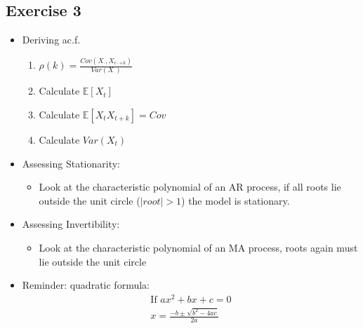\subsection{Exercise 3}
\begin{itemize}
    \item Deriving ac.f. 
    \begin{enumerate}
        \item[] $\rho(k)=\frac{Cov(X_\cdot, X_{c\cdot + k})}{Var(X_\cdot)} $
        \item Calculate $\mathbb{E}[X_t]$
        \item Calculate $\mathbb{E}[X_t X_{t+k}] = Cov$
        \item Calculate $Var(X_t)$
    \end{enumerate}
    \item Assessing Stationarity:
    \begin{itemize}
        \item Look at the characteristic polynomial of an AR process, if all roots lie outside the unit circle ($|root|>1$) the model is stationary.
    \end{itemize}
    \item Assessing Invertibility:
    \begin{itemize}
        \item Look at the characteristic polynomial of an MA process, roots again must lie outside the unit circle
    \end{itemize}
    \item Reminder: quadratic formula:
    \begin{align*}
        \text{If } ax^2 +bx+c=0 \\
        x=\frac{-b \pm \sqrt{b^2-4ac}}{2a}
    \end{align*}
\end{itemize}